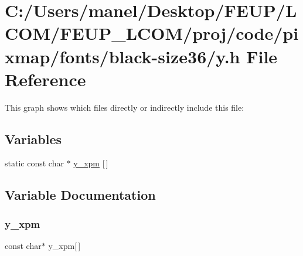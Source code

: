 \hypertarget{black-size36_2y_8h}{}\section{C\+:/\+Users/manel/\+Desktop/\+F\+E\+U\+P/\+L\+C\+O\+M/\+F\+E\+U\+P\+\_\+\+L\+C\+O\+M/proj/code/pixmap/fonts/black-\/size36/y.h File Reference}
\label{black-size36_2y_8h}
This graph shows which files directly or indirectly include this file\+:
\subsection*{Variables}
\begin{DoxyCompactItemize}
\item 
static const char $\ast$ \mbox{\hyperlink{black-size36_2y_8h_acf3c4baab42ea76bde9b05db2e3bd381}{y\+\_\+xpm}} \mbox{[}$\,$\mbox{]}
\end{DoxyCompactItemize}


\subsection{Variable Documentation}
\mbox{\label{black-size36_2y_8h_acf3c4baab42ea76bde9b05db2e3bd381}} 
\subsubsection{\texorpdfstring{y\_xpm}{y\_xpm}}
{\footnotesize\ttfamily const char$\ast$ y\+\_\+xpm\mbox{[}$\,$\mbox{]}\hspace{0.3cm}{\ttfamily [static]}}

